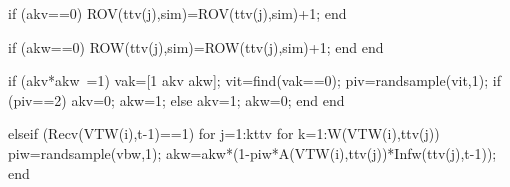                                                          
                                                          if (akv==0)
                                                             ROV(ttv(j),sim)=ROV(ttv(j),sim)+1;
                                                          end
                                                          
                                                          if (akw==0)
                                                             ROW(ttv(j),sim)=ROW(ttv(j),sim)+1;
                                                          end
                                                    end  
                                                     
                                                                if (akv*akw~=1)                                                                    
                                                                       vak=[1 akv akw];
                                                                       vit=find(vak==0); 
                                                                       piv=randsample(vit,1);
                                                                       if (piv==2)
                                                                            akv=0;
                                                                            akw=1;
                                                                       else
                                                                            akv=1;
                                                                            akw=0;
                                                                       end                                                                       
                                                                end
                                          
                                          elseif (Recv(VTW(i),t-1)==1)
                                                     for j=1:kttv                                                                                                  
                                                          for k=1:W(VTW(i),ttv(j))                                                                
                                                                piw=randsample(vbw,1);
                                                                akw=akw*(1-piw*A(VTW(i),ttv(j))*Infw(ttv(j),t-1));                                                                 
                                                          end
                                                          
